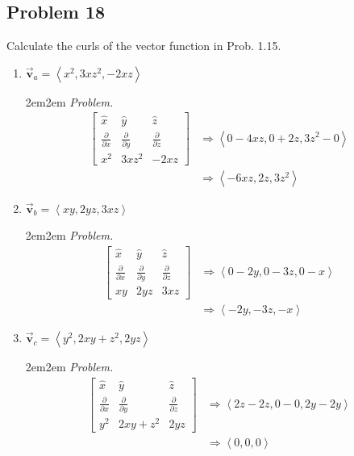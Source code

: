 \documentclass[10pt,oneside]{book}
\newcommand{\gspc}{\vspace{0.13cm}} %
\newcommand{\prt}[2]{\frac{\partial#1}{\partial#2}}
\let\endoldproof\endproof
\newenvironment{problem}[1]
  {\vspace{-0.1cm}\begin{coloredadjust}\begin{adjustwidth}{2em}{2em}
   \textit{Problem. }#1}
  {\endoldproof
\end{adjustwidth}\end{coloredadjust}\gspc}
\newcommand{\pvec}[1]{\left\langle#1\right\rangle}
\newcommand{\vv}{\vec{\mathbf{v}}}
\newcommand{\dps}{\displaystyle}
\newcommand{\delmatrix}[3]{\begin{bmatrix}\dps\hat x&\dps\hat y&\dps\hat z\\\dps\prt{}x&\dps\prt{}y&\dps\prt{}z\\\dps#1&\dps#2&\dps#3\end{bmatrix}}
\begin{document}
\subsection*{Problem 18}
Calculate the curls of the vector function in Prob. 1.15.
\begin{enumerate}
  \item $\vv_a =\pvec{x^2, 3xz^2, -2xz}$
  \begin{problem}
    \begin{align*}
      \delmatrix{x^2}{3xz^2}{-2xz}&\Rightarrow \pvec{0 - 4xz, 0 +2z, 3z^2-0}\\
      &\Rightarrow \pvec{-6xz, 2z, 3z^2}
    \end{align*}
  \end{problem}
  \item $\vv_b = \pvec{xy, 2yz, 3xz}$
  \begin{problem}
    \begin{align*}
      \delmatrix{xy}{2yz}{3xz}&\Rightarrow \pvec{0 - 2y, 0 - 3z, 0 - x}\\
      &\Rightarrow \pvec{-2y, -3z, -x}
    \end{align*}
  \end{problem}
  \item $\vv_c = \pvec{y^2, 2xy+z^2, 2yz}$
  \begin{problem}
    \begin{align*}
      \delmatrix{y^2}{2xy+z^2}{2yz}&\Rightarrow \pvec{2z - 2z, 0 - 0, 2y - 2y}\\
      &\Rightarrow\pvec{0, 0, 0}
    \end{align*}
  \end{problem}
\end{enumerate}
\pagebreak
\end{document}
